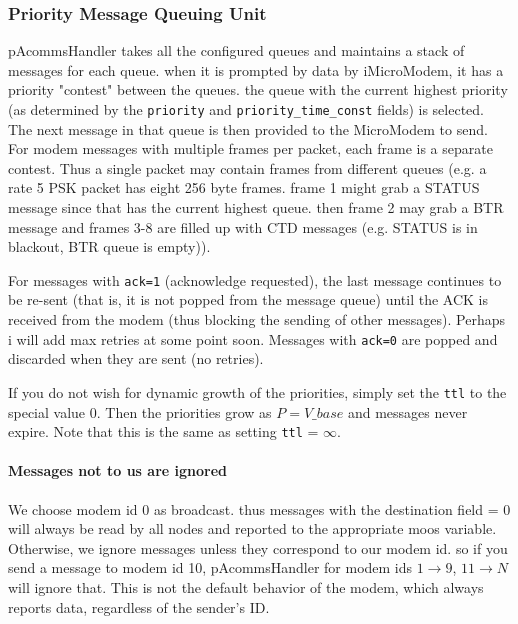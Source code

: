 \documentclass[11pt, letterpaper, oneside]{memoir}
\begin{document}
\begin{itemize}
%
%

\subsubsection{Priority Message Queuing Unit}

pAcommsHandler takes all the configured queues and maintains a stack of messages for each
  queue. when it is prompted by data by iMicroModem, it has a priority
  "contest" between the queues. the queue with the current highest
  priority (as determined by the \verb|priority| and
  \verb|priority_time_const| fields) is selected. The next message in
  that queue is then provided to the MicroModem to send. For modem
  messages with multiple frames per packet, each frame is a separate
  contest. Thus a single packet may contain frames from different
  queues (e.g. a rate 5 PSK packet has eight 256 byte frames. frame 1
  might grab a STATUS message since that has the current highest
  queue. then frame 2 may grab a BTR message and frames 3-8 are filled
  up with CTD messages (e.g. STATUS is in blackout, BTR queue is
  empty)).

For messages with \verb|ack=1| (acknowledge requested), the last
  message continues to be re-sent (that is, it is not popped from the
  message queue) until the ACK is received from the modem (thus
  blocking the sending of other messages). Perhaps i will add max
  retries at some point soon. Messages with \verb|ack=0| are popped
  and discarded when they are sent (no retries).

If you do not wish for dynamic growth of the priorities, simply
  set the \verb|ttl| to the special value 0. Then the priorities grow as $P = V\_{base}$ and messages never expire. Note that this is the same as setting \verb|ttl| = $\infty$.

\paragraph{Messages not to us are ignored} We choose modem id 0 as broadcast. thus messages with the destination
  field = 0 will always be read by all nodes and reported to the
  appropriate moos variable. Otherwise, we ignore messages unless they
  correspond to our modem id. so if you send a message to modem id 10,
  pAcommsHandler for modem ids $1 \rightarrow 9$, $11\rightarrow N$
  will ignore that. This is not the default behavior of the modem,
  which always reports data, regardless of the sender's ID.
  

\end{itemize}
\end{document}
